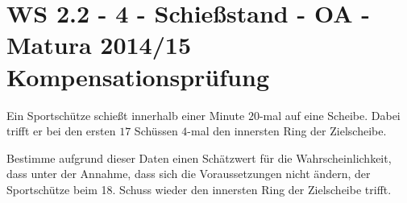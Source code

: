 \section{WS 2.2 - 4 - Schießstand - OA - Matura 2014/15 Kompensationsprüfung}

\begin{beispiel}[WS 2.2]{1} %
				Ein Sportschütze schießt innerhalb einer Minute $20$-mal auf eine Scheibe. Dabei trifft er bei den ersten $17$ Schüssen $4$-mal den innersten Ring der Zielscheibe.
				
				Bestimme aufgrund dieser Daten einen Schätzwert für die Wahrscheinlichkeit, dass unter der Annahme, dass sich die Voraussetzungen nicht ändern, der Sportschütze beim 18. Schuss wieder den innersten Ring der Zielscheibe trifft.
				
\end{beispiel}